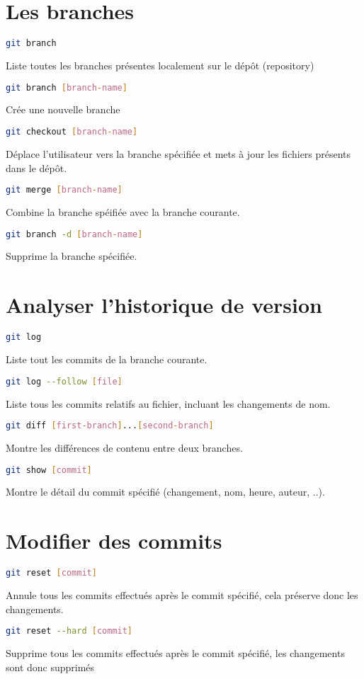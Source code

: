 \documentclass[10pt,landscape]{article}
\begin{document}
\begin{multicols*}{3}
\section{Les branches}
\begin{lstlisting}[language=bash]
git branch
\end{lstlisting}
Liste toutes les branches présentes localement sur le dépôt (repository)
\begin{lstlisting}[language=bash]
git branch [branch-name]
\end{lstlisting}
Crée une nouvelle branche
\begin{lstlisting}[language=bash]
git checkout [branch-name]
\end{lstlisting}
Déplace l'utilisateur vers la branche spécifiée et mets à jour les fichiers présents dans le dépôt.
\begin{lstlisting}[language=bash]
git merge [branch-name]
\end{lstlisting}
Combine la branche spéifiée avec la branche courante.
\begin{lstlisting}[language=bash]
git branch -d [branch-name]
\end{lstlisting}
Supprime la branche spécifiée.

\section{Analyser l'historique de version}
\begin{lstlisting}[language=bash]
git log
\end{lstlisting}
Liste tout les commits de la branche courante.
\begin{lstlisting}[language=bash]
git log --follow [file]
\end{lstlisting}
Liste tous les commits relatifs au fichier, incluant les changements de nom.
\begin{lstlisting}[language=bash]
git diff [first-branch]...[second-branch]
\end{lstlisting}
Montre les différences de contenu entre deux branches.
\begin{lstlisting}[language=bash]
git show [commit]
\end{lstlisting}
Montre le détail du commit spécifié (changement, nom, heure, auteur, ..).

\section{Modifier des commits}
\begin{lstlisting}[language=bash]
git reset [commit]
\end{lstlisting}
Annule tous les commits effectués après le commit spécifié, cela préserve donc les changements.
\begin{lstlisting}[language=bash]
git reset --hard [commit]
\end{lstlisting}
Supprime tous les commits effectués après le commit spécifié, les changements sont donc supprimés


\end{multicols*}
\end{document}
